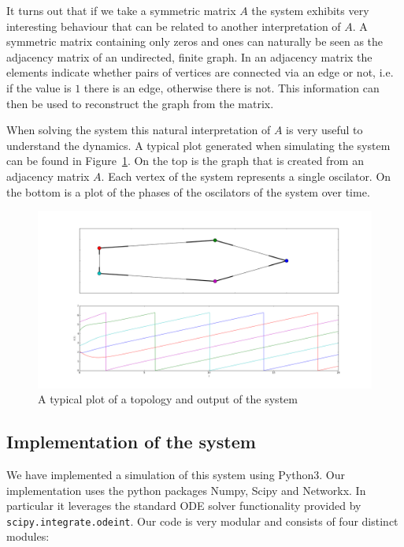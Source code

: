 It turns out that if we take a symmetric matrix $A$ the system exhibits very interesting behaviour that can be related to another interpretation of $A$. A symmetric matrix containing only zeros and ones can naturally be seen as the adjacency matrix of an undirected, finite graph. In an adjacency matrix the elements indicate whether pairs of vertices are connected via an edge or not, i.e. if the value is $1$ there is an edge, otherwise there is not. This information can then be used to reconstruct the graph from the matrix. 

When solving the system this natural interpretation of $A$ is very useful to understand the dynamics. A typical plot generated when simulating the system can be found in Figure~\ref{fig:adjacencymatrix}. On the top is the graph that is created from an adjacency matrix $A$. Each vertex of the system represents a single oscilator. On the bottom is a plot of the phases of the oscilators of the system over time. 

\begin{figure}[h]
\centering
\includegraphics[width=\textwidth]{imgs/examplefigure}
\caption{A typical plot of a topology and output of the system}
\label{fig:adjacencymatrix}
\end{figure}

\subsection{Implementation of the system}
We have implemented a simulation of this system using Python3. Our implementation uses the python packages Numpy, Scipy and Networkx. In particular it leverages the standard ODE solver functionality provided by \lstinline{scipy.integrate.odeint}. Our code is very modular and consists of four distinct modules: 


